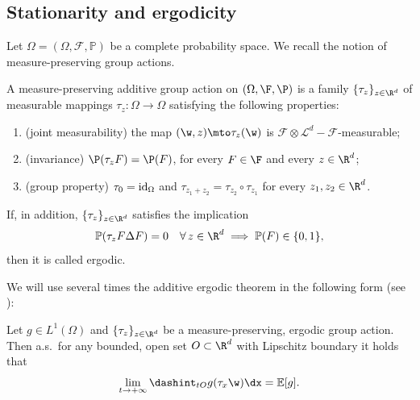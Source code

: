 \subsection{Stationarity and ergodicity}
Let $\Omega=(\Omega,\mathcal{F},\mathbb{P})$ be a complete probability space. We recall the notion of measure-preserving group actions.
%
\begin{definition}\label{def:group-action} A measure-preserving additive group action on $(\Omega,\F,\P)$ is a family $\{\tau_z\}_{z\in\R^d}$ of measurable mappings $\tau_z:\Omega\to\Omega$ satisfying the following properties:
%
\begin{enumerate}
\item\label{joint} (joint measurability) the map $(\w,z)\mto\tau_z(\w)$ is $\mathcal{F}\otimes\mathcal{L}^d-\mathcal{F}$-measurable;
\item\label{inv} (invariance) $\P(\tau_z F)=\P(F)$, for every $F\in\F$ and every $z\in\R^d$;
\item\label{group} (group property) $\tau_0=\rm id_\Omega$ and $\tau_{z_1+z_2}=\tau_{z_2}\circ\tau_{z_1}$ for every $z_1,z_2\in\R^d$.
\end{enumerate}
%
If, in addition, $\{\tau_z\}_{z\in\R^d}$ satisfies the implication
%
\begin{equation*}
\mathbb{P}(\tau_zF\Delta F)=0\quad\forall\, z\in\R^d\implies \mathbb{P}(F)\in\{0,1\},
\end{equation*}
%
then it is called ergodic.
\end{definition}
We will use several times the additive ergodic theorem in the following form (see \cite[Prop.\,2.1]{ArSm}):
\begin{theorem}\label{thm.additiv_ergodic}
Let $g\in L^1(\Omega)$ and $\{\tau_z\}_{z\in\R^d}$ be a measure-preserving, ergodic group action. Then a.s.\ for any bounded, open set $O\subset\R^d$ with Lipschitz boundary it holds that
\begin{equation*}
\lim_{t\to +\infty}\dashint_{tO}g(\tau_x\w)\dx=\mathbb{E}[g].
\end{equation*}
\end{theorem}
%
%

